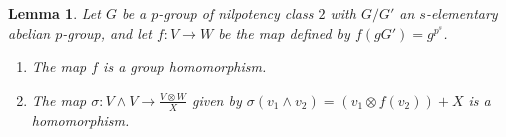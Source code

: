 \documentclass[preprint,sort&compress,12pt]{elsarticle}
\newtheorem{lemma}[theorem]{Lemma}
\numberwithin{equation}{section}
\theoremstyle{definition}
\begin{document}

 


 \begin{lemma} \label{required homomorphism}
     Let $G$ be a $p$-group of nilpotency class $2$ with $G/G'$ an $s$-elementary abelian $p$-group, and let $f:V \to W$ be the map defined by ${f(gG')=g^{p^s}}$.
     \begin{enumerate}
         \item[(i)] The map $f$ is a group homomorphism.
         \item[(ii)] The map $\sigma: V \wedge V \to \frac{V \otimes W}{X}$ given by $\sigma(v_1 \wedge v_2)=(v_1 \otimes f(v_2))+X$ is a homomorphism.
     \end{enumerate}
 \end{lemma}
\end{document}
